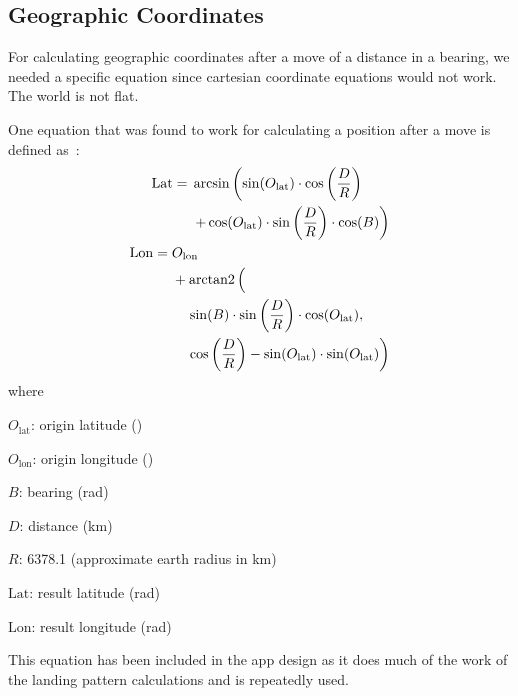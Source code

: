 \subsection{Geographic Coordinates}
For calculating geographic coordinates after a move of a distance in a bearing, we needed a specific equation since cartesian coordinate equations would not work. The world is not flat.

One equation that was found to work for calculating a position after a move is defined as~\cite{m_david_stackoverflow:_????}:
\begin{align}
  \begin{split}
    \mathrm{Lat} ={} &\arcsin\left(\sin(O_{\mathrm{lat}}) \cdot \cos\left(\frac{D}{R}\right) \right. \\
                     &\left.+ \cos(O_{\mathrm{lat}}) \cdot \sin\left(\frac{D}{R}\right) \cdot \cos(B)\right)
  \end{split}\label{eq:move-in-lat}\\
  \begin{split}
    \mathrm{Lon} ={} &O_{\mathrm{lon}} \\
                     & + \operatorname{arctan2}\left(\frac{}{}\right. \\
                     &\left.\quad\sin(B) \cdot \sin\left(\frac{D}{R}\right) \cdot \cos(O_{\mathrm{lat}}),\right. \\
                     &\left.\quad\cos\left(\frac{D}{R}\right) - \sin(O_{\mathrm{lat}}) \cdot \sin(O_{\mathrm{lat}})\right)
  \end{split}\label{eq:move-in-lon}
\end{align}
where
\begin{description}
  \item $O_{\mathrm{lat}}$: origin latitude (\si{\deg})
  \item $O_{\mathrm{lon}}$: origin longitude (\si{\deg})
  \item $B$: bearing (\si{\radian})
  \item $D$: distance (\si{\kilo\metre})
  \item $R$: 6378.1 (approximate earth radius in \si{\kilo\metre})
  \item $\mathrm{Lat}$: result latitude (\si{\radian})
  \item $\mathrm{Lon}$: result longitude (\si{\radian})
\end{description}

This equation has been included in the app design as it does much of the work of the landing pattern calculations and is repeatedly used.

